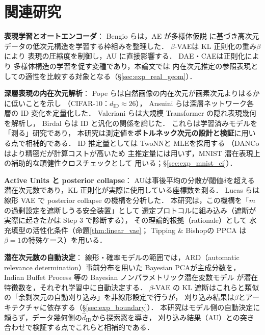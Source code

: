 \documentclass[11pt,a4paper]{jsarticle}
\newcommand{\dID}{d_{\mathrm{ID}}}
\newcommand{\hatdID}{\hat{d}_{\mathrm{ID}}}
\begin{document}
\section{関連研究}\label{sec:related}

\textbf{表現学習とオートエンコーダ}：
Bengio ら\cite{bengio2013representation}は，AE が多様体仮説
\cite{fefferman2016manifold}に基づき高次元データの低次元構造を学習する枠組みを整理した．
$\beta$-VAE\cite{higgins2017betavae}は KL 正則化の重み$\beta$により
表現の圧縮度を制御し，AU に直接影響する．
DAE\cite{alain2014dae}・CAE\cite{rifai2011cae}は正則化により
多様体構造の学習を促す変種であり，本論文では
内在次元推定の参照表現としての適性を比較する対象となる（§\ref{sec:exp_real_geom}）．

\textbf{深層表現の内在次元解析}：
Pope ら\cite{pope2021intrinsic}は自然画像の内在次元が画素次元よりはるかに低いことを示し
（CIFAR-10：$\dID \approx 26$），
Ansuini ら\cite{ansuini2019intrinsic}は深層ネットワーク各層の ID 変化を定量化した．
Valeriani ら\cite{valeriani2023geometry}は大規模 Transformer の隠れ表現幾何を解析し，
Birdal ら\cite{birdal2021intrinsic}は ID と汎化の関係を論じた．
これらは学習済みモデルを「測る」研究であり，
本研究は測定値を\textbf{ボトルネック次元の設計と検証}に用いる点で相補的である．
ID 推定量としては TwoNN\cite{facco2017twonn}と MLE\cite{levina2005mle}を採用する
（DANCo\cite{ceruti2014danco}はより精密だが計算コストが高いため
主推定量には用いず，MNIST 潜在表現上の補助的な頑健性クロスチェックとして
用いる；§\ref{sec:exp_mnist_ci}）．

\textbf{Active Units と posterior collapse}：
AU\cite{higgins2017betavae,lucas2019elbo}は事後平均の分散が閾値$\delta$を超える
潜在次元数であり，KL 正則化が実際に使用している座標数を測る．
Lucas ら\cite{lucas2019elbo}は線形 VAE で posterior collapse の機構を分析した．
本研究は，この機構を「$m$の過剰設定を遮断しうる安全装置」として
選定プロトコルに組み込み（遮断が実際に起きたかは Step 3 で診断する），
その理論的根拠（rationale）として
水充填型の活性化条件（命題\ref{thm:linear_vae}；
Tipping \& Bishop\cite{tippingbishop1999ppca}の PPCA は$\beta=1$の特殊ケース）を用いる．

\textbf{潜在次元数の自動決定}：
線形・確率モデルの範囲では，ARD（automatic relevance determination）事前分布を用いた
Bayesian PCA\cite{bishop1999bayesian}が主成分数を，
Indian Buffet Process 等の Bayesian ノンパラメトリック潜在変数モデル
\cite{ghahramani2005infinite}が潜在特徴数を，それぞれ学習中に自動決定する．
$\beta$-VAE の KL 遮断はこれらと類似の「余剰次元の自動刈り込み」を非線形設定で行うが，
刈り込み結果は$\beta$とアーキテクチャに依存する（§\ref{sec:exp_boundary}）．
本研究はモデル側の自動決定に頼らず，データ幾何側の$\hatdID$から探索窓を導き，
刈り込み結果（AU）との突き合わせで検証する点でこれらと相補的である．
\end{document}
